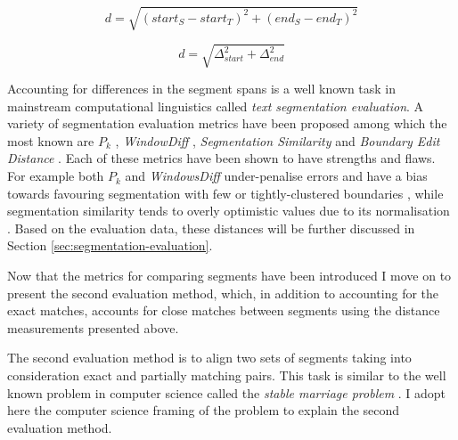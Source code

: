     \begin{equation} \label{eq:distance}
    d= \sqrt{(start_S - start_T)^{2}+(end_S-end_T)^{2}}
    \end{equation}
    
    \begin{equation} \label{eq:distance-simpliefied}
    d= \sqrt{\varDelta_{start} ^{2}+\varDelta_{end}^{2}}
    \end{equation}
    
    Accounting for differences in the segment spans is a well known task in mainstream computational linguistics called \textit{text segmentation evaluation}. A variety of segmentation evaluation metrics have been proposed among which the most known are $P_k$ \citep[198--200]{beeferman1999statistical}, \textit{WindowDiff} \citep[10]{pevzner2002critique}, \textit{Segmentation Similarity} \citep[154-156]{fournier2012segmentation} and \textit{Boundary Edit Distance} \citep{fournier2013evaluating}. Each of these metrics have been shown to have strengths and flaws. For example both $P_k$ and \textit{WindowsDiff} under-penalise errors \citep{lamprier2007evaluation} and have a bias towards favouring segmentation with few or tightly-clustered boundaries \citep{niekrasz2010unbiased}, while segmentation similarity tends to overly optimistic values due to its normalisation \citep{fournier2013evaluating}. Based on the evaluation data, these distances will be further discussed in Section \ref{sec:segmentation-evaluation}. 
    

    Now that the metrics for comparing segments have been introduced I move on to present the second evaluation method, which, in addition to accounting for the exact matches, accounts for close matches between segments using the distance measurements presented above. 
    
    The second evaluation method is to align two sets of segments taking into consideration exact and partially matching pairs. This task is similar to the well known problem in computer science called the \textit{stable marriage problem} \citep{Gusfield1989}. I adopt here the computer science framing of the problem to explain the second evaluation method.
    
